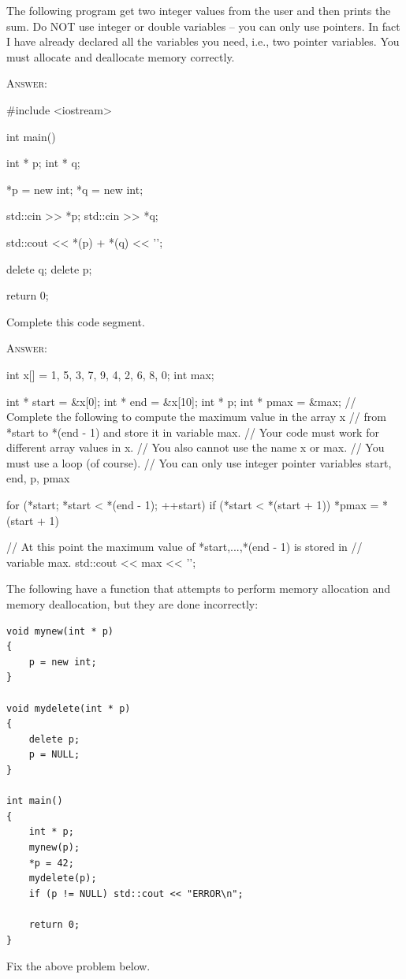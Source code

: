 \newpage
\nextq
The following program get two integer values from the user 
and then prints the sum.
Do NOT use integer or double variables -- you can only use pointers.
In fact I have already declared all the variables you need,
i.e., two pointer variables.
You must allocate and deallocate memory correctly.

\textsc{Answer:}
\begin{answercode}
#include <iostream>

int main()
{
    int * p;
    int * q;

    *p = new int;
    *q = new int;

    std::cin >> *p;
    std::cin >> *q;

    std::cout << *(p) + *(q) << '\n'; 

    delete q;
    delete p;


    return 0;
}
\end{answercode}

\newpage
\nextq
Complete this code segment.

\textsc{Answer:}
\begin{answercode}
int x[] = {1, 5, 3, 7, 9, 4, 2, 6, 8, 0};
int max;

int * start = &x[0];
int * end = &x[10];
int * p;
int * pmax = &max;
// Complete the following to compute the maximum value in the array x
// from *start to *(end - 1) and store it in variable max.
// Your code must work for different array values in x.
// You also cannot use the name x or max.
// You must use a loop (of course).
// You can only use integer pointer variables start, end, p, pmax

for (*start; *start < *(end - 1); ++start)
{
  if (*start < *(start + 1))
  {
    *pmax = *(start + 1)
  }
}

// At this point the maximum value of *start,...,*(end - 1) is stored in
// variable max.
std::cout << max << '\n';
\end{answercode}

\newpage
\nextq
The following have a function that attempts to perform memory allocation
and memory deallocation, but
they are done incorrectly:
\vspace{-3mm}
\begin{Verbatim}[frame=single,fontsize=\small]
void mynew(int * p)
{
    p = new int;
}

void mydelete(int * p)
{
    delete p;
    p = NULL;
}

int main()
{
    int * p;
    mynew(p);
    *p = 42;
    mydelete(p);
    if (p != NULL) std::cout << "ERROR\n";
    
    return 0;
}
\end{Verbatim}
\vspace{-5mm}Fix the above problem below.

